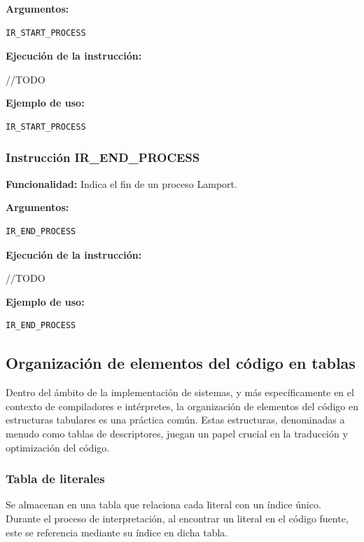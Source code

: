 \noindent
\textbf{Argumentos:}
\begin{verbatim}
IR_START_PROCESS
\end{verbatim}

\noindent
\textbf{Ejecución de la instrucción:}
\vspace{0.3cm}

\noindent
//TODO
\vspace{0.3cm}

\noindent
\textbf{Ejemplo de uso:}
\begin{verbatim}
IR_START_PROCESS
\end{verbatim}

\subsubsection{Instrucción IR\_END\_PROCESS}\label{subsubsec:IR_END_PROCESS}
\noindent
\textbf{Funcionalidad:} Indica el fin de un proceso Lamport.

\noindent
\textbf{Argumentos:}
\begin{verbatim}
IR_END_PROCESS
\end{verbatim}

\noindent
\textbf{Ejecución de la instrucción:}
\vspace{0.3cm}

\noindent
//TODO
\vspace{0.3cm}

\noindent
\textbf{Ejemplo de uso:}
\begin{verbatim}
IR_END_PROCESS
\end{verbatim}

\subsection{Organización de elementos del código en tablas}
Dentro del ámbito de la implementación de sistemas, y más específicamente en el contexto de compiladores e intérpretes, la organización de elementos del código en estructuras tabulares es una práctica común. Estas estructuras, denominadas a menudo como tablas de descriptores, juegan un papel crucial en la traducción y optimización del código.

\subsubsection{Tabla de literales}
Se almacenan en una tabla que relaciona cada literal con un índice único. Durante el proceso de interpretación, al encontrar un literal en el código fuente, este se referencia mediante su índice en dicha tabla.

